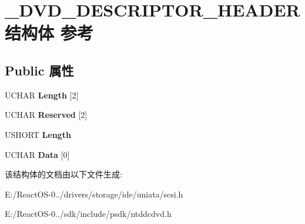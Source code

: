 \hypertarget{struct___d_v_d___d_e_s_c_r_i_p_t_o_r___h_e_a_d_e_r}{}\section{\+\_\+\+D\+V\+D\+\_\+\+D\+E\+S\+C\+R\+I\+P\+T\+O\+R\+\_\+\+H\+E\+A\+D\+E\+R结构体 参考}
\label{struct___d_v_d___d_e_s_c_r_i_p_t_o_r___h_e_a_d_e_r}
\subsection*{Public 属性}
\begin{DoxyCompactItemize}
\item 
\mbox{\label{struct___d_v_d___d_e_s_c_r_i_p_t_o_r___h_e_a_d_e_r_a0ad09891b55579f63f56739c92d98030}} 
U\+C\+H\+AR {\bfseries Length} \mbox{[}2\mbox{]}
\item 
\mbox{\label{struct___d_v_d___d_e_s_c_r_i_p_t_o_r___h_e_a_d_e_r_ac17e224b3164db1b4ac15a80dfe9a517}} 
U\+C\+H\+AR {\bfseries Reserved} \mbox{[}2\mbox{]}
\item 
\mbox{\label{struct___d_v_d___d_e_s_c_r_i_p_t_o_r___h_e_a_d_e_r_ab9791ac467316e3b540c8d27e27e191a}} 
U\+S\+H\+O\+RT {\bfseries Length}
\item 
\mbox{\label{struct___d_v_d___d_e_s_c_r_i_p_t_o_r___h_e_a_d_e_r_aa3eb4ed2bcd8fc4424a6b76626517091}} 
U\+C\+H\+AR {\bfseries Data} \mbox{[}0\mbox{]}
\end{DoxyCompactItemize}


该结构体的文档由以下文件生成\+:\begin{DoxyCompactItemize}
\item 
E\+:/\+React\+O\+S-\/0../drivers/storage/ide/uniata/scsi.\+h\item 
E\+:/\+React\+O\+S-\/0../sdk/include/psdk/ntddcdvd.\+h\end{DoxyCompactItemize}
